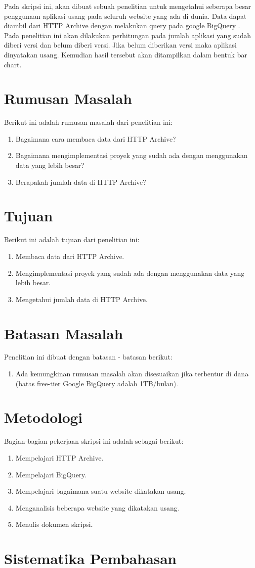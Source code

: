 Pada skripsi ini, akan dibuat sebuah penelitian untuk mengetahui seberapa besar penggunaan aplikasi usang pada seluruh website yang ada di dunia. Data dapat diambil dari HTTP Archive dengan melakukan query pada google BigQuery . Pada penelitian ini akan dilakukan perhitungan pada jumlah aplikasi yang sudah diberi versi dan belum diberi versi. Jika belum diberikan versi maka aplikasi dinyatakan usang. Kemudian hasil tersebut akan ditampilkan dalam bentuk bar chart.


\section{Rumusan Masalah}
\label{sec:rumusan}
Berikut ini adalah rumusan masalah dari penelitian ini:
\begin{enumerate}
	\item Bagaimana cara membaca data dari HTTP Archive?
	\item Bagaimana mengimplementasi proyek yang sudah ada dengan menggunakan data yang lebih besar?
	\item Berapakah jumlah data di HTTP Archive?
\end{enumerate}


\section{Tujuan}
\label{sec:tujuan}
Berikut ini adalah tujuan dari penelitian ini:
\begin{enumerate}
	\item Membaca data dari HTTP Archive.
	\item Mengimplementasi proyek yang sudah ada dengan menggunakan data yang lebih besar.
	\item Mengetahui jumlah data di HTTP Archive.
\end{enumerate}


\section{Batasan Masalah}
\label{sec:batasan}
Penelitian ini dibuat dengan batasan - batasan berikut:
\begin{enumerate}
	\item Ada kemungkinan rumusan masalah akan disesuaikan jika terbentur di dana (batas free-tier Google BigQuery adalah 1TB/bulan).
\end{enumerate}


\section{Metodologi}
\label{sec:metlit}
Bagian-bagian pekerjaan skripsi ini adalah sebagai berikut:
\begin{enumerate}
	\item Mempelajari HTTP Archive.
	\item Mempelajari BigQuery.
	\item Mempelajari bagaimana suatu website dikatakan usang.
	\item Menganalisis beberapa website yang dikatakan usang.
	\item Menulis dokumen skripsi.
\end{enumerate}


\section{Sistematika Pembahasan}
\label{sec:sispem}
